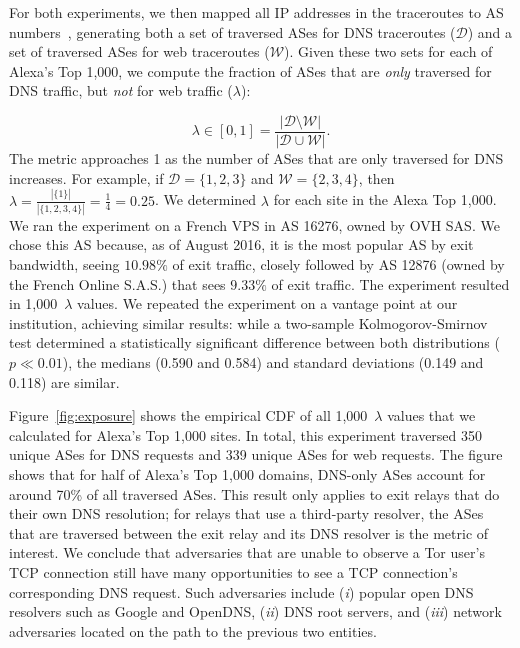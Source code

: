 For both experiments, we then mapped all IP addresses in the traceroutes to AS
numbers~\cite{ipasn}, generating both a set of traversed ASes for DNS traceroutes
($\mathcal{D}$) and a set of traversed ASes for web traceroutes
($\mathcal{W}$).  Given these two sets for each of Alexa's Top
1,000, we compute the fraction of ASes that are \emph{only}
traversed for DNS traffic, but \emph{not} for web traffic ($\lambda$):

\begin{equation}
\label{equ:exposure}
\lambda \in [0, 1] =
\frac{|\mathcal{D} \setminus \mathcal{W}|}
     {|\mathcal{D} \cup \mathcal{W}|}.
\end{equation}
\noindent
The metric approaches 1 as the number of ASes that are only traversed for DNS
increases.  For example, if $\mathcal{D} = \{1,2,3\}$ and $\mathcal{W} =
\{2,3,4\}$, then $\lambda = \frac{|\{1\}|}{|\{1,2,3,4\}|} = \frac{1}{4} =
0.25$.  We determined $\lambda$ for each site in the Alexa Top 1,000.  We ran
the experiment on a French VPS in AS 16276, owned by OVH SAS.  We chose this AS
because, as of August 2016, it is the most popular AS by exit bandwidth, seeing
$10.98\%$ of exit traffic, closely followed by AS 12876 (owned by the French
Online S.A.S.) that sees $9.33\%$ of exit traffic.  The experiment resulted in
1,000~$\lambda$ values.  We repeated the experiment on a vantage point at our
institution, achieving similar results: while a two-sample Kolmogorov-Smirnov
test determined a statistically significant difference between both
distributions ($p \ll 0.01$), the medians (0.590 and 0.584) and standard
deviations (0.149 and 0.118) are similar.
%
%

Figure~\ref{fig:exposure} shows the empirical CDF of all 1,000~$\lambda$ values
that we calculated for Alexa's Top 1,000 sites.  In total, this experiment
traversed 350 unique ASes for DNS requests and 339 unique ASes for web requests.
The figure shows that for half of Alexa's Top 1,000 domains, DNS-only ASes
account for around 70\% of all traversed ASes.  This result
only applies to exit relays that do their own DNS resolution; for relays that
use a third-party resolver, the ASes that are traversed between
the exit relay and its DNS resolver is the metric of interest.  We conclude that adversaries that are
unable to observe a Tor user's TCP connection still have many opportunities to
see a TCP connection's corresponding DNS request.  Such adversaries include (\emph{i}) popular open
DNS resolvers such as Google and OpenDNS, (\emph{ii}) DNS root servers, and
(\emph{iii}) network adversaries located on the path to the previous two
entities.

